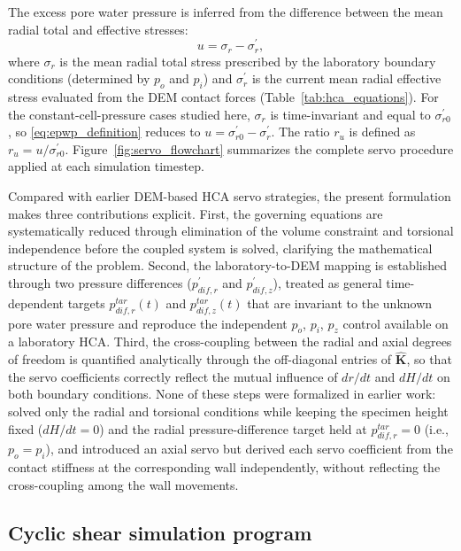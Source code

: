 \documentclass[a4paper,fleqn]{cas-sc}
\newcommand{\ru}{\ensuremath{r_u}}
\begin{document}
The excess pore water pressure is inferred from the difference between the mean radial total and effective stresses:
\begin{equation}
u = \sigma_r - \sigma_r^{\prime},
\label{eq:epwp_definition}
\end{equation}
where $\sigma_r$ is the mean radial total stress prescribed by the laboratory boundary conditions (determined by $p_o$ and $p_i$) and $\sigma_r^{\prime}$ is the current mean radial effective stress evaluated from the DEM contact forces (Table~\ref{tab:hca_equations}). For the constant-cell-pressure cases studied here, $\sigma_r$ is time-invariant and equal to $\sigma_{r0}^{\prime}$, so \cref{eq:epwp_definition} reduces to $u = \sigma_{r0}^{\prime} - \sigma_r^{\prime}$. The ratio $\ru$ is defined as $\ru = u/\sigma_{r0}^{\prime}$. Figure~\ref{fig:servo_flowchart} summarizes the complete servo procedure applied at each simulation timestep.

Compared with earlier DEM-based HCA servo strategies, the present formulation makes three contributions explicit. First, the governing equations are systematically reduced through elimination of the volume constraint and torsional independence before the coupled system is solved, clarifying the mathematical structure of the problem. Second, the laboratory-to-DEM mapping is established through two pressure differences ($p_{dif,r}^{\prime}$ and $p_{dif,z}^{\prime}$), treated as general time-dependent targets $p_{dif,r}^{tar}(t)$ and $p_{dif,z}^{tar}(t)$ that are invariant to the unknown pore water pressure and reproduce the independent $p_o$, $p_i$, $p_z$ control available on a laboratory HCA. Third, the cross-coupling between the radial and axial degrees of freedom is quantified analytically through the off-diagonal entries of $\hat{\mathbf{K}}$, so that the servo coefficients correctly reflect the mutual influence of $dr/dt$ and $dH/dt$ on both boundary conditions. None of these steps were formalized in earlier work: \citet{Han2024jgs} solved only the radial and torsional conditions while keeping the specimen height fixed ($dH/dt=0$) and the radial pressure-difference target held at $p_{dif,r}^{tar}=0$ (i.e., $p_o=p_i$), and \citet{Ma2024} introduced an axial servo but derived each servo coefficient from the contact stiffness at the corresponding wall independently, without reflecting the cross-coupling among the wall movements.

\FloatBarrier

\subsection{Cyclic shear simulation program}
\label{subsec:cyclic_program}
\end{document}
